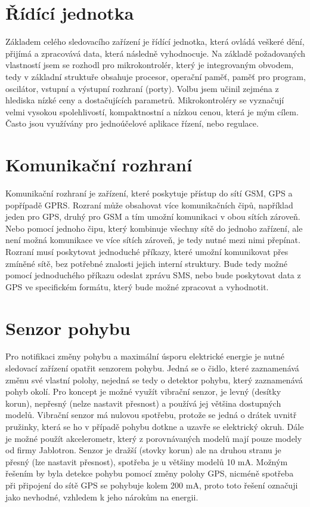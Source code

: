 \documentclass[FM,MP]{tulthesis}  %
\begin{document}
\section{Řídící jednotka}
Základem celého sledovacího zařízení je řídící jednotka, která ovládá veškeré dění, přijímá a zpracovává data, která následně vyhodnocuje. Na základě požadovaných vlastností jsem se rozhodl pro mikrokontrolér, který je integrovaným obvodem, tedy v základní struktuře obsahuje procesor, operační paměť, paměť pro program, oscilátor, vstupní a výstupní rozhraní (porty). Volbu jsem učinil zejména z hlediska nízké ceny a dostačujících parametrů. Mikrokontroléry se vyznačují velmi vysokou spolehlivostí, kompaktnostní a nízkou cenou, která je mým cílem. Často jsou využívány pro jednoúčelové aplikace řízení, nebo regulace.

\section{Komunikační rozhraní}
Komunikační rozhraní je zařízení, které poskytuje přístup do sítí GSM, GPS a popřípadě GPRS. Rozraní může obsahovat více komunikačních čipů, například jeden pro GPS, druhý pro GSM a tím umožní komunikaci v obou sítích zároveň. Nebo pomocí jednoho čipu, který kombinuje všechny sítě do jednoho zařízení, ale není možná komunikace ve více sítích zároveň, je tedy nutné mezi nimi přepínat. Rozraní musí poskytovat jednoduché příkazy, které umožní komunikovat přes zmíněné sítě, bez potřebné znalosti jejich interní struktury. Bude tedy možné pomocí jednoduchého příkazu odeslat zprávu SMS, nebo bude poskytovat data z GPS ve specifickém formátu, který bude možné zpracovat a vyhodnotit.

\section{Senzor pohybu}
Pro notifikaci změny pohybu a maximální úsporu elektrické energie je nutné sledovací zařízení opatřit senzorem pohybu. Jedná se o čidlo, které zaznamenává změnu své vlastní polohy, nejedná se tedy o detektor pohybu, který zaznamenává pohyb okolí. Pro koncept je možné využít vibrační senzor, je levný (desítky korun), nepřesný (nelze nastavit přesnost) a používá jej většina dostupných modelů. Vibrační senzor má nulovou spotřebu, protože se jedná o drátek uvnitř pružinky, která se ho v případě pohybu dotkne a uzavře se elektrický okruh. Dále je možné použít akcelerometr, který z porovnávaných modelů mají pouze modely od firmy Jablotron. Senzor je dražší (stovky korun) ale na druhou stranu je přesný (lze nastavit přesnost), spotřeba je u většiny modelů 10 mA. Možným řešením by byla detekce pohybu pomocí změny polohy GPS, nicméně spotřeba při připojení do sítě GPS se pohybuje kolem 200 mA, proto toto řešení označuji jako nevhodné, vzhledem k jeho nárokům na energii.
\end{document}
